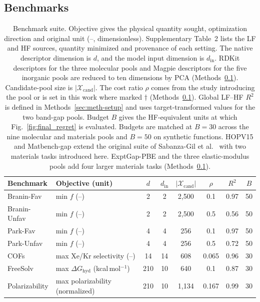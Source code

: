 \documentclass[pdflatex,sn-nature,iicol]{sn-jnl}%
\begin{document}
\subsection{Benchmarks}\label{sec:meth-benchmarks}

\begin{table}[t]
\centering
\footnotesize
\caption{Benchmark suite. Objective gives the physical quantity sought, optimization direction and original unit (--, dimensionless). Supplementary Table~2 lists the LF and HF sources, quantity minimized and provenance of each setting. The native descriptor dimension is $d$, and the model input dimension is $d_{\mathrm{in}}$. RDKit descriptors for the three molecular pools and Magpie descriptors for the five inorganic pools are reduced to ten dimensions by PCA (Methods~\ref{sec:meth-benchmarks}). Candidate-pool size is $|\mathcal{X}_{\mathrm{cand}}|$. The cost ratio $\rho$ comes from the study introducing the pool or is set in this work where marked $\dagger$ (Methods~\ref{sec:meth-benchmarks}). Global LF--HF $R^2$ is defined in Methods~\ref{sec:meth-setup} and uses target-transformed values for the two band-gap pools. Budget $B$ gives the HF-equivalent units at which Fig.~\ref{fig:final_regret} is evaluated. Budgets are matched at $B = 30$ across the nine molecular and materials pools and $B = 50$ on synthetic functions. HOPV15 and Matbench-gap extend the original suite of Sabanza-Gil et al.~\citep{sabanza2025best} with two materials tasks introduced here. ExptGap-PBE and the three elastic-modulus pools add four larger materials tasks (Methods~\ref{sec:meth-benchmarks}).}
\label{tab:benchmarks}
\begin{tabular}{llcccccc}
\toprule
\textbf{Benchmark} & \textbf{Objective (unit)} & $d$ & $d_{\mathrm{in}}$ & $|\mathcal{X}_{\mathrm{cand}}|$ & $\rho$ & $R^2$ & $B$ \\
\midrule
Branin-Fav & min $f$ (--) & 2 & 2 & 2{,}500 & 0.1 & 0.97 & 50 \\
Branin-Unfav & min $f$ (--) & 2 & 2 & 2{,}500 & 0.5 & 0.56 & 50 \\
Park-Fav & min $f$ (--) & 4 & 4 & 256 & 0.1 & 0.97 & 50 \\
Park-Unfav & min $f$ (--) & 4 & 4 & 256 & 0.5 & 0.72 & 50 \\
COFs & max Xe/Kr selectivity (--) & 14 & 14 & 608 & 0.065 & 0.96 & 30 \\
FreeSolv & max $\Delta G_{\mathrm{hyd}}$ (kcal\,mol$^{-1}$) & 210 & 10 & 640 & 0.1 & 0.87 & 30 \\
Polarizability & max polarizability (normalized) & 210 & 10 & 1{,}134 & 0.167 & 0.99 & 30 \\

\end{tabular}
\end{table}
\end{document}
